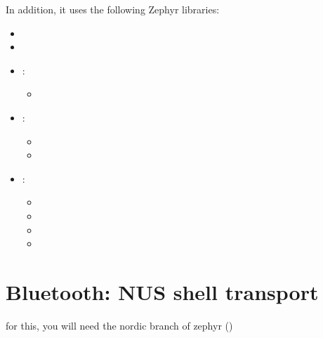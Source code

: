 \documentclass[letterpaper,10pt,english]{sphinxmanual}
\begin{document}
In addition, it uses the following Zephyr libraries:
\begin{itemize}
\item {} 

\item {} 

\item {} 
:
\begin{itemize}
\item {} 

\end{itemize}

\item {} 
:
\begin{itemize}
\item {} 

\item {} 

\end{itemize}

\item {} 
:
\begin{itemize}
\item {} 

\item {} 

\item {} 

\item {} 

\end{itemize}

\end{itemize}


\section{Bluetooth: NUS shell transport}
\label{\detokenize{samples/shell_bt_nus/README:bluetooth-nus-shell-transport}}\label{\detokenize{samples/shell_bt_nus/README:shell-bt-nus}}\label{\detokenize{samples/shell_bt_nus/README::doc}}
for this, you will need the nordic branch of zephyr ()
\end{document}
